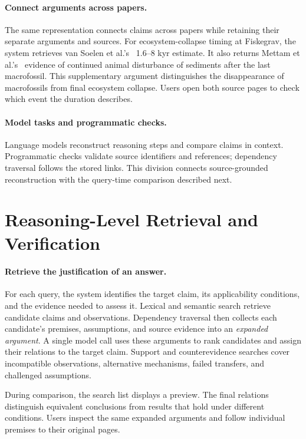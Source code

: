 \documentclass[sigconf,screen,review]{acmart}
\begin{document}
\paragraph{Connect arguments across papers.}
The same representation connects claims across papers while retaining their separate arguments and sources. For ecosystem-collapse timing at Fiskegrav, the system retrieves van Soelen et al.'s~\cite{fiskegravduration} 1.6--8 kyr estimate. It also returns Mettam et al.'s~\cite{fiskegravevent} evidence of continued animal disturbance of sediments after the last macrofossil. This supplementary argument distinguishes the disappearance of macrofossils from final ecosystem collapse. Users open both source pages to check which event the duration describes.


\paragraph{Model tasks and programmatic checks.}
Language models reconstruct reasoning steps and compare claims in context. Programmatic checks validate source identifiers and references; dependency traversal follows the stored links. This division connects source-grounded reconstruction with the query-time comparison described next.

\section{Reasoning-Level Retrieval and Verification}
\label{sec:verification}
\paragraph{Retrieve the justification of an answer.}
For each query, the system identifies the target claim, its applicability conditions, and the evidence needed to assess it. Lexical and semantic search retrieve candidate claims and observations. Dependency traversal then collects each candidate's premises, assumptions, and source evidence into an \emph{expanded argument}. A single model call uses these arguments to rank candidates and assign their relations to the target claim. Support and counterevidence searches cover incompatible observations, alternative mechanisms, failed transfers, and challenged assumptions.

During comparison, the search list displays a preview. The final relations distinguish equivalent conclusions from results that hold under different conditions. Users inspect the same expanded arguments and follow individual premises to their original pages.
\end{document}
